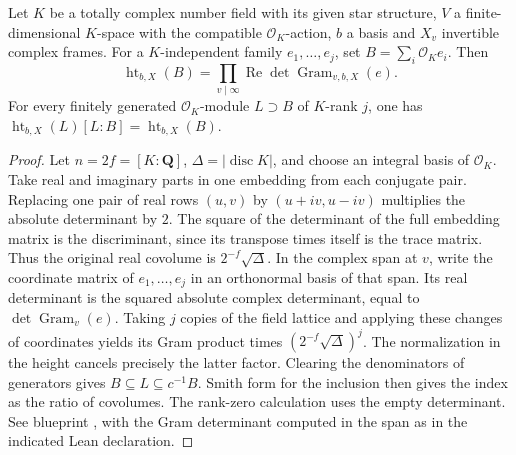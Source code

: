 
\begin{theorem}\label{pn:P049}
Let \(K\) be a totally complex number field with its given star structure, \(V\) a finite-dimensional \(K\)-space with the compatible \(\mathcal O_K\)-action, \(b\) a basis and \(X_v\) invertible complex frames. For a \(K\)-independent family \(e_1,\ldots,e_j\), set \(B=\sum_i\mathcal O_K e_i\). Then
\[
 \operatorname{ht}_{b,X}(B)=\prod_{v\mid\infty}\operatorname{Re}\det\operatorname{Gram}_{v,b,X}(e).
\]
For every finitely generated \(\mathcal O_K\)-module \(L\supset B\) of \(K\)-rank \(j\), one has \(\operatorname{ht}_{b,X}(L)[L:B]=\operatorname{ht}_{b,X}(B)\).
\end{theorem}
\begin{proof}
Let \(n=2f=[K:\mathbf Q]\), \(\Delta=|\operatorname{disc}K|\), and choose an integral basis of \(\mathcal O_K\). Take real and imaginary parts in one embedding from each conjugate pair. Replacing one pair of real rows \((u,v)\) by \((u+iv,u-iv)\) multiplies the absolute determinant by \(2\). The square of the determinant of the full embedding matrix is the discriminant, since its transpose times itself is the trace matrix. Thus the original real covolume is \(2^{-f}\sqrt\Delta\). In the complex span at \(v\), write the coordinate matrix of \(e_1,\ldots,e_j\) in an orthonormal basis of that span. Its real determinant is the squared absolute complex determinant, equal to \(\det\operatorname{Gram}_v(e)\). Taking \(j\) copies of the field lattice and applying these changes of coordinates yields its Gram product times \((2^{-f}\sqrt\Delta)^j\). The normalization in the height cancels precisely the latter factor. Clearing the denominators of generators gives \(B\subseteq L\subseteq c^{-1}B\). Smith form for the inclusion then gives the index as the ratio of covolumes. The rank-zero calculation uses the empty determinant. See blueprint , with the Gram determinant computed in the span as in the indicated Lean declaration.
\end{proof}
